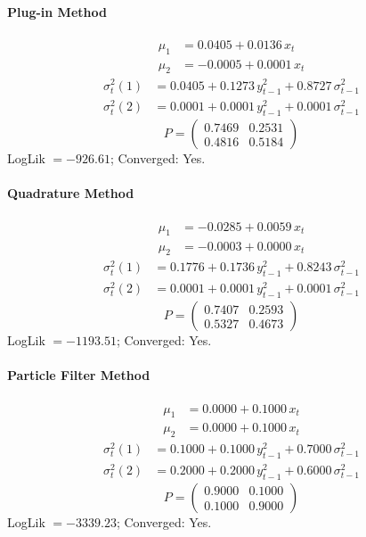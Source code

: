 \documentclass[11pt, a4paper]{article}
\begin{document}
\paragraph{Plug-in Method}
\begin{align}
\mu_{1} &= 0.0405 + 0.0136\, x_t \\
\mu_{2} &= -0.0005 + 0.0001\, x_t
\end{align}
\begin{align}
\sigma^2_{t}(1) &= 0.0405 + 0.1273\, y_{t-1}^2 + 0.8727\, \sigma^2_{t-1} \\
\sigma^2_{t}(2) &= 0.0001 + 0.0001\, y_{t-1}^2 + 0.0001\, \sigma^2_{t-1}
\end{align}
\begin{equation}
P = \begin{pmatrix} 0.7469 & 0.2531 \\ 0.4816 & 0.5184 \end{pmatrix}
\end{equation}
LogLik $= -926.61$; Converged: Yes.

\paragraph{Quadrature Method}
\begin{align}
\mu_{1} &= -0.0285 + 0.0059\, x_t \\
\mu_{2} &= -0.0003 + 0.0000\, x_t
\end{align}
\begin{align}
\sigma^2_{t}(1) &= 0.1776 + 0.1736\, y_{t-1}^2 + 0.8243\, \sigma^2_{t-1} \\
\sigma^2_{t}(2) &= 0.0001 + 0.0001\, y_{t-1}^2 + 0.0001\, \sigma^2_{t-1}
\end{align}
\begin{equation}
P = \begin{pmatrix} 0.7407 & 0.2593 \\ 0.5327 & 0.4673 \end{pmatrix}
\end{equation}
LogLik $= -1193.51$; Converged: Yes.

\paragraph{Particle Filter Method}
\begin{align}
\mu_{1} &= 0.0000 + 0.1000\, x_t \\
\mu_{2} &= 0.0000 + 0.1000\, x_t
\end{align}
\begin{align}
\sigma^2_{t}(1) &= 0.1000 + 0.1000\, y_{t-1}^2 + 0.7000\, \sigma^2_{t-1} \\
\sigma^2_{t}(2) &= 0.2000 + 0.2000\, y_{t-1}^2 + 0.6000\, \sigma^2_{t-1}
\end{align}
\begin{equation}
P = \begin{pmatrix} 0.9000 & 0.1000 \\ 0.1000 & 0.9000 \end{pmatrix}
\end{equation}
LogLik $= -3339.23$; Converged: Yes.
\end{document}
